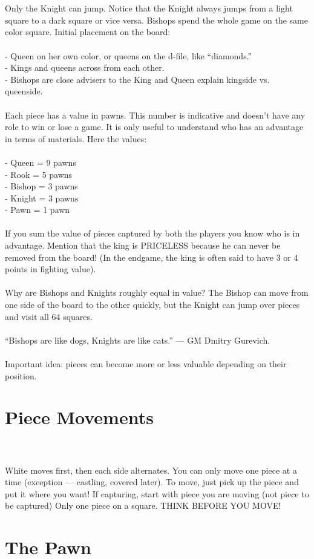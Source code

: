 \documentclass{article}
\begin{document}

\\
\\
Only the Knight can jump. Notice that the Knight always jumps from a light square to a dark square or vice versa. Bishops spend the whole game on the same color square. Initial placement on the board:\\\\- Queen on her own color, or queens on the d-file, like “diamonds.”\\- Kings and queens across from each other.\\- Bishops are close advisers to the King and Queen explain kingside vs. queenside.\\\\Each piece has a value in pawns. This number is indicative and doesn't have any role to win or lose a game. It is only useful to understand who has an advantage in terms of materials. Here the values:\\\\- Queen = 9 pawns\\- Rook = 5 pawns\\- Bishop = 3 pawns\\- Knight = 3 pawns\\- Pawn = 1 pawn\\\\If you sum the value of pieces captured by both the players you know who is in advantage. Mention that the king is PRICELESS because he can never be removed from the board! (In the endgame, the king is often said to have 3 or 4 points in fighting value).\\\\Why are Bishops and Knights roughly equal in value? The Bishop can move from one side of the board to the other quickly, but the Knight can jump over pieces and visit all 64 squares.\\\\“Bishops are like dogs, Knights are like cats.” — GM Dmitry Gurevich.\\\\Important idea: pieces can become more or less valuable depending on their position.\section{ Piece Movements}

\\
\\
White moves first, then each side alternates. You can only move one piece at a time (exception — castling, covered later). To move, just pick up the piece and put it where you want! If capturing, start with piece you are moving (not piece to be captured) Only one piece on a square. THINK BEFORE YOU MOVE!\section{ The Pawn}
\end{document}
